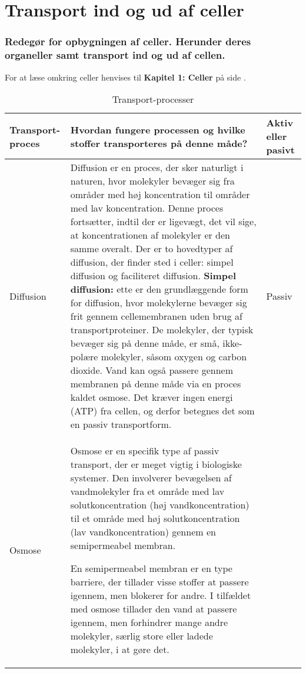 \newpage
\part{Transport ind og ud af celler}
    \section*{Redegør for opbygningen af celler. Herunder deres organeller samt transport ind og ud af cellen.}
        For at læse omkring celler henvises til \textbf{Kapitel 1: Celler} på side \pageref{sec:celletyperogderesorganeller}.
        \begin{center}
            \begin{longtable}{ | m{2cm} | m{11cm}| m{2cm} |}
                \caption{Transport-processer} \\
                \hline
                \textbf{Transport-proces} & \textbf{Hvordan fungere processen og hvilke stoffer transporteres på denne måde?} & \textbf{Aktiv eller pasivt}\\
                \hline
                Diffusion & Diffusion er en proces, der sker naturligt i naturen, hvor molekyler bevæger sig fra områder med høj koncentration til områder med lav koncentration. 
                Denne proces fortsætter, indtil der er ligevægt, det vil sige, at koncentrationen af molekyler er den samme overalt. Der er to hovedtyper af diffusion, der finder sted i celler: 
                simpel diffusion og faciliteret diffusion. \textbf{Simpel diffusion:}  ette er den grundlæggende form for diffusion, hvor molekylerne bevæger sig frit gennem cellemembranen uden brug af transportproteiner. 
                De molekyler, der typisk bevæger sig på denne måde, er små, ikke-polære molekyler, såsom oxygen og carbon dioxide. Vand kan også passere gennem membranen på denne måde via en proces kaldet osmose. Det kræver ingen energi (ATP) fra cellen, og derfor betegnes det som en passiv transportform. & Passiv\\
                \hline
                Osmose & Osmose er en specifik type af passiv transport, der er meget vigtig i biologiske systemer. Den involverer bevægelsen af vandmolekyler fra et område med lav solutkoncentration (høj vandkoncentration) til et område med høj solutkoncentration (lav vandkoncentration) gennem en semipermeabel membran.

                En semipermeabel membran er en type barriere, der tillader visse stoffer at passere igennem, men blokerer for andre. I tilfældet med osmose tillader den vand at passere igennem, men forhindrer mange andre molekyler, særlig store eller ladede molekyler, i at gøre det.
                

\end{longtable}
\end{center}
